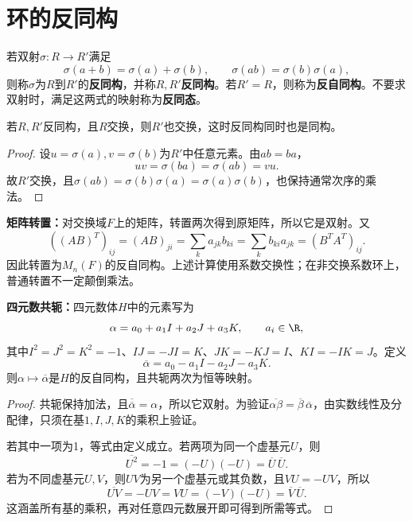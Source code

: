 \section{环的反同构}


\begin{definition}
若双射$\sigma:R\to R'$满足
\[
\sigma(a+b)=\sigma(a)+\sigma(b),\qquad
\sigma(ab)=\sigma(b)\sigma(a),
\]
则称$\sigma$为$R$到$R'$的\textbf{反同构}，并称$R,R'$\textbf{反同构}。若$R'=R$，则称为\textbf{反自同构}。不要求双射时，满足这两式的映射称为\textbf{反同态}。
\end{definition}

\begin{proposition}
若$R,R'$反同构，且$R$交换，则$R'$也交换，这时反同构同时也是同构。
\end{proposition}
\begin{proof}
设$u=\sigma(a),v=\sigma(b)$为$R'$中任意元素。由$ab=ba$，
\[
uv=\sigma(ba)=\sigma(ab)=vu.
\]
故$R'$交换，且$\sigma(ab)=\sigma(b)\sigma(a)=\sigma(a)\sigma(b)$，也保持通常次序的乘法。
\end{proof}

\begin{example}
\textbf{矩阵转置：}对交换域$F$上的矩阵，转置两次得到原矩阵，所以它是双射。又
\[
((AB)^T)_{ij}=(AB)_{ji}=\sum_k a_{jk}b_{ki}
=\sum_k b_{ki}a_{jk}=(B^TA^T)_{ij}.
\]
因此转置为$M_n(F)$的反自同构。上述计算使用系数交换性；在非交换系数环上，普通转置不一定颠倒乘法。
\end{example}

\begin{example}
\textbf{四元数共轭：}四元数体$H$中的元素写为
\[
\alpha=a_0+a_1I+a_2J+a_3K,\qquad a_i\in\R,
\]
其中$I^2=J^2=K^2=-1$、$IJ=-JI=K$、$JK=-KJ=I$、$KI=-IK=J$。定义
\[
\overline\alpha=a_0-a_1I-a_2J-a_3K.
\]
则$\alpha\mapsto\overline\alpha$是$H$的反自同构，且共轭两次为恒等映射。
\end{example}
\begin{proof}
共轭保持加法，且$\overline{\overline\alpha}=\alpha$，所以它双射。为验证$\overline{\alpha\beta}=\overline\beta\,\overline\alpha$，由实数线性及分配律，只须在基$1,I,J,K$的乘积上验证。

若其中一项为1，等式由定义成立。若两项为同一个虚基元$U$，则
\[
\overline{U^2}=-1=(-U)(-U)=\overline U\,\overline U.
\]
若为不同虚基元$U,V$，则$UV$为另一个虚基元或其负数，且$VU=-UV$，所以
\[
\overline{UV}=-UV=VU=(-V)(-U)=\overline V\,\overline U.
\]
这涵盖所有基的乘积，再对任意四元数展开即可得到所需等式。
\end{proof}

